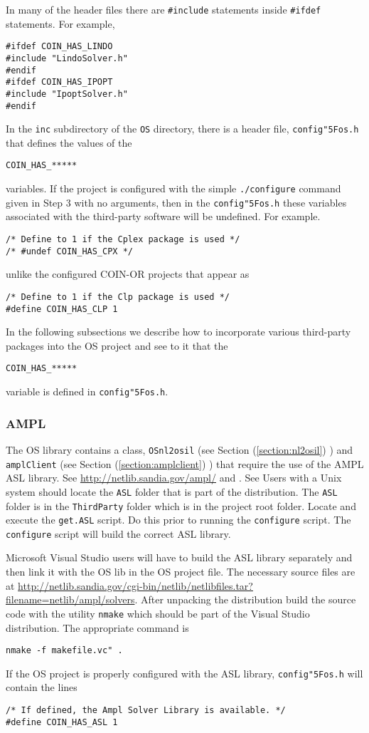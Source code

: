 \documentclass[11pt]{article}
\renewcommand{\_}{{\char"5F}}
\renewcommand{\{}{{\char"7B}}
\renewcommand{\}}{{\char"7D}}
\renewcommand{\^}{{\char"0D}}
\renewcommand{\'}{{\char"0D}}
\begin{document}
In many of the header files there are {\tt \#include} statements inside {\tt  \#ifdef}  statements. For example,
\begin{verbatim}
#ifdef COIN_HAS_LINDO    
#include "LindoSolver.h"
#endif  
#ifdef COIN_HAS_IPOPT    
#include "IpoptSolver.h"
#endif 
\end{verbatim}
In the {\tt inc} subdirectory of the {\tt OS}  directory, there is a header file, {\tt config\_os.h} that defines the values of the  
\begin{verbatim}
COIN_HAS_*****
\end{verbatim}
variables. If the project is configured with the simple {\tt ./configure} command given in Step 3 with no arguments, then in the {\tt config\_os.h} these variables associated with the third-party software will be undefined. For example.
\begin{verbatim}
/* Define to 1 if the Cplex package is used */
/* #undef COIN_HAS_CPX */
\end{verbatim}
unlike the configured COIN-OR projects that appear as
\begin{verbatim}
/* Define to 1 if the Clp package is used */
#define COIN_HAS_CLP 1
\end{verbatim}
In the following subsections we  describe how to incorporate various  third-party packages into the OS project and see to it that the 
\begin{verbatim}
COIN_HAS_*****
\end{verbatim}
variable is defined in  {\tt config\_os.h}.

\subsubsection{AMPL}

The OS library contains a class, {\tt OSnl2osil} (see Section (\ref{section:nl2osil}) ) and {\tt amplClient} (see Section (\ref{section:amplclient}) ) that require the use of the AMPL ASL library.  See \url{http://netlib.sandia.gov/ampl/}  and  \url{}. See Users with a Unix system should locate the {\tt ASL} folder that is part of the distribution. The {\tt ASL} folder is in the {\tt ThirdParty} folder which is in the project root folder. Locate and execute the {\tt get.ASL} script.  Do this prior to running the {\tt configure} script. The {\tt configure} script will build the correct ASL library. 

Microsoft  Visual Studio users will have to build the ASL library separately and then link it with the OS lib in the OS project file.  The necessary source files are at \url{http://netlib.sandia.gov/cgi-bin/netlib/netlibfiles.tar?filename=netlib/ampl/solvers}.  After unpacking the distribution build the source code with the utility {\tt nmake} which should be part of the Visual Studio distribution. The appropriate command is
\begin{verbatim}
nmake -f makefile.vc" .
\end{verbatim}
If the OS project is properly configured  with the ASL library, {\tt config\_os.h} will contain the lines
\begin{verbatim}
/* If defined, the Ampl Solver Library is available. */
#define COIN_HAS_ASL 1
\end{verbatim}
\end{document}
